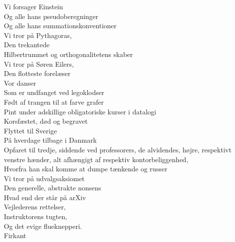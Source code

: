 \documentclass[a4paper,11pt]{article}
\begin{document}
\begin{sketch}
 Vi forsager Einstein \\
Og alle hans pseudoberegninger \\
Og alle hans summationskonventioner \\
Vi tror på Pythagoras, \\
Den trekantede \\
Hilbertrummet og orthogonalitetens skaber \\
Vi tror på Søren Eilers, \\
Den flotteste forelæser \\
Vor danser \\
Som er undfanget ved legoklodser \\
Født af trangen til at farve grafer \\
Pint under adskillige obligatoriske kurser i datalogi \\
Korsfæstet, død og begravet \\
Flyttet til Sverige \\
På hverdage tilbage i Danmark \\
Opfaret til tredje, siddende ved professorers, de alvidendes, højre, respektivt venstre hænder, alt afhængigt af respektiv kontorbeliggenhed, \\
Hvorfra han skal komme at dumpe tænkende og russer \\
Vi tror på udvalgsaksiomet \\
Den generelle, abstrakte nonsens \\
Hvad end der står på arXiv \\
Vejlederens rettelser, \\
Instruktorens tugten, \\
Og det evige flueknepperi. \\
Firkant

\end{sketch}
\end{document}
